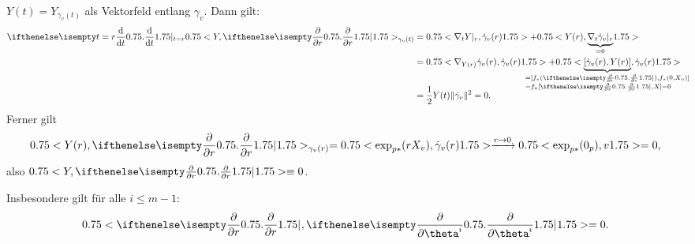 \begin{bew}
\begin{center}
\end{center}

$Y(t) = Y_{\gamma_v(t)}$ als Vektorfeld entlang $\gamma_v$.
Dann gilt:
\begin{align*}
	\difffrac[t=r]{}{t} \left<Y,\pdifffrac{}{r}\right>_{\gamma_v(t)} & = \left<\nabla_tY|_r, \dot \gamma_v(r)\right> + \left<Y(r), \smash{\underbrace{\nabla_t\dot\gamma_v|_r}_{=0}}\right> \vphantom{\underbrace{\gamma_v}_{0}}\\
	& = \left<\nabla_{Y(r)}\dot\gamma_v(r), \dot \gamma_v(r)\right> + \left< \smash{\underbrace{[\dot\gamma_v(r),Y(r)]}_{\mathclap{\begin{subarray}{l}= [f_{*}(\pdifffrac{}{r}),f_{*}(0,X_v)]\\ = f_{*}[\pdifffrac{}{r},X] = 0\end{subarray}}}}, \dot \gamma_v(r) \vphantom{\nabla_{Y(r)}} \right>  \vphantom{\underbrace{\gamma_v(r)}_{\pdifffrac{}{r}} }\\
	&= \frac{1}{2}Y(t) \|\dot\gamma_v\|^2 = 0.
\end{align*}
Ferner gilt
\begin{align*}
	\left<Y(r),\pdifffrac{}{r}\right>_{\gamma_v(r)} = \left<\exp_{p*}(rX_v),\dot\gamma_v(r)\right> \xrightarrow{r \to 0}\left<\exp_{p*}(0_p),v\right> = 0,
\end{align*}
also $\left<Y,\pdifffrac{}{r}\right> \equiv 0$.
\end{bew}

\begin{bem}
  Insbesondere gilt für alle $i \leq m-1$:
  \begin{align*}
    \left<\pdifffrac{}{r}, \pdifffrac{}{\theta^i}\right> = 0.
  \end{align*}
\end{bem}

